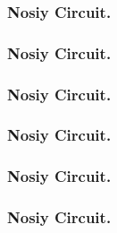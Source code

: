 \documentclass{beamer}
\begin{document}
\newcommand\DECSLIDE[2]{
\begin{frame}
\frametitle{Nosiy Circuit.}

\end{frame}
}


\DECSLIDE{test_test_correction_all_major_2_8-20_30x4.svg}{ Majoritiy }
\DECSLIDE{test_test_correction_by_colors_2_8-20_30x4.svg}{ Colors }
\DECSLIDE{test_test_correction_rand_2_8-20_30x4.svg}{ Picking Random }
\DECSLIDE{test_test_correction_by_SWIFT_2_8-20_30x4.svg}{ SWIFT }
\DECSLIDE{test_test_correction_by_MAX_2_8-20_30x4.svg}{ Max Color }
\DECSLIDE{test_test_correction_accu_by_MAX_2_8-20_30x4.svg}{ Max Color }
\end{document}
